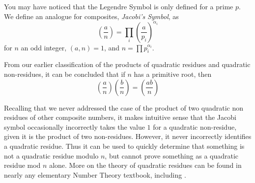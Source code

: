 \documentclass{article}
\newtheorem*{theorem}{Theorem}
\newtheorem*{definition}{Definition}
\begin{document}
\par You may have noticed that the Legendre Symbol is only defined for a prime $p$. We define an analogue for composites, \textit{Jacobi's Symbol}, as
 \[\left( \dfrac{a}{n} \right)  = \prod_i \left( \frac{a}{p_i} \right) ^{\alpha_i} \]
  for $n$ an odd integer, $(a,n) = 1$, and $n = \prod p_i^{\alpha_i}$. 
  
\par From our earlier classification of the products of quadratic residues and quadratic non-residues, it can be concluded that if $n$ has a primitive root, then 
\[ \left(\dfrac{a}{n} \right) \left( \dfrac{b}{n} \right) = \left(\dfrac{ab}{n} \right) \]

\par Recalling that we never addressed the case of the product of two quadratic non residues of other composite numbers, it makes intuitive sense that the Jacobi symbol occasionally incorrectly takes the value $1$ for a quadratic non-residue, given it is the product of two non-residues. However, it never incorrectly identifies a quadratic residue.  Thus it can be used to quickly determine that something is not a quadratic residue modulo $n$, but cannot prove something as a quadratic residue mod $n$ alone. More on the theory of quadratic residues can be found  in nearly any elementary Number Theory textbook, including \citep{niven}.



\end{document}
